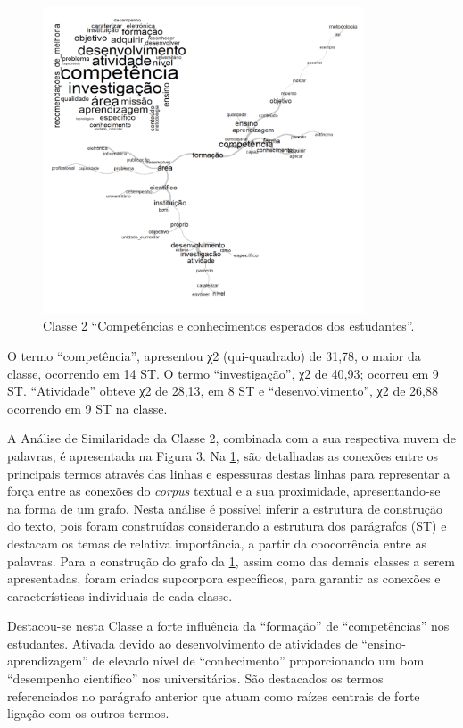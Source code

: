 \documentclass{textolivre}
\begin{document}
\begin{figure}[htbp]
 \centering
 \includegraphics[width=0.85\textwidth]{Fig03.png}
 \caption{Classe 2 “Competências e conhecimentos esperados dos estudantes”.}
 \label{Fig03}
\end{figure}

O termo “competência”, apresentou χ2 (qui-quadrado) de 31,78, o maior da classe, ocorrendo em 14 ST. O termo “investigação”, χ2 de 40,93; ocorreu em 9 ST. “Atividade” obteve χ2 de 28,13, em 8 ST e “desenvolvimento”, χ2 de 26,88 ocorrendo em 9 ST na classe.

A Análise de Similaridade da Classe 2, combinada com a sua respectiva nuvem de palavras, é apresentada na Figura 3. 
Na \cref{Fig03}, são detalhadas as conexões entre os principais termos através das linhas e espessuras destas linhas para representar a força entre as conexões do \textit{corpus} textual e a sua proximidade, apresentando-se na forma de um grafo. Nesta análise é possível inferir a estrutura de construção do texto, pois foram construídas considerando a estrutura dos parágrafos (ST) e destacam os temas de relativa importância, a partir da coocorrência entre as palavras. Para a construção do grafo da \cref{Fig03}, assim como das demais classes a serem apresentadas, foram criados supcorpora específicos, para garantir as conexões e características individuais de cada classe.

Destacou-se nesta Classe a forte influência da “formação” de “competências” nos estudantes. Ativada devido ao desenvolvimento de atividades de “ensino-aprendizagem” de elevado nível de “conhecimento” proporcionando um bom “desempenho científico” nos universitários. São destacados os termos referenciados no parágrafo anterior que atuam como raízes centrais de forte ligação com os outros termos.
\end{document}
